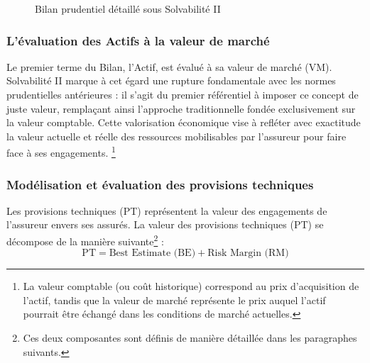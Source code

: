 \begin{figure}[H]
    \caption{Bilan prudentiel détaillé sous Solvabilité II}
    \label{fig:Bilan_economique_S2_detaille}
\end{figure}


\subsubsection{L'évaluation des Actifs à la valeur de marché}

Le premier terme du Bilan, l'Actif, est évalué à sa valeur de marché (VM). Solvabilité II marque à cet égard une rupture fondamentale avec les normes prudentielles antérieures : il s'agit du premier référentiel à imposer ce concept de juste valeur, remplaçant ainsi l'approche traditionnelle fondée exclusivement sur la valeur comptable. Cette valorisation économique vise à refléter avec exactitude la valeur actuelle et réelle des ressources mobilisables par l'assureur pour faire face à ses engagements. \footnote{La valeur comptable (ou coût historique) correspond au prix d'acquisition de l'actif, tandis que la valeur de marché représente le prix auquel l'actif pourrait être échangé dans les conditions de marché actuelles.
}


\subsubsection{Modélisation et évaluation des provisions techniques}

Les provisions techniques (PT) représentent la valeur des engagements de l'assureur envers ses assurés. La valeur des provisions techniques (PT) se décompose de la manière suivante\footnote{Ces deux composantes sont définis de manière détaillée dans les paragraphes suivants.} :
\begin{equation}
    \text{PT} = \text{Best Estimate (BE)} + \text{Risk Margin (RM)}
\end{equation}


